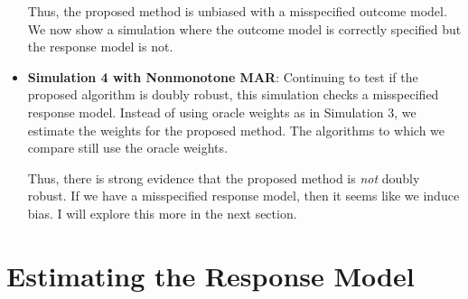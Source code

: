 \documentclass[12pt]{article}
\begin{document}
\begin{itemize}
    
    
    

    \newpage

    Thus, the proposed method is unbiased with a misspecified outcome model.
    We now show a simulation where the outcome model is correctly specified but
    the response model is not.

  \item \textbf{Simulation 4 with Nonmonotone MAR}:
    Continuing to test if the proposed algorithm is doubly robust, this
    simulation checks a misspecified response model. Instead of using oracle
    weights as in Simulation 3, we estimate the weights for the proposed method.
    The algorithms to which we compare still use the oracle weights.

    
    
    

    Thus, there is strong evidence that the proposed method is \textit{not}
    doubly robust. If we have a misspecified response model, then it seems like
    we induce bias. I will explore this more in the next section.

\end{itemize}

\newpage

\section*{Estimating the Response Model}
\end{document}
